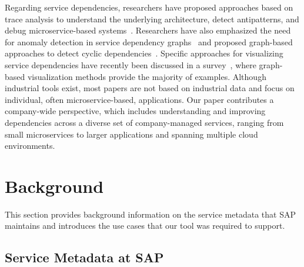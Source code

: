 \documentclass[conference]{IEEEtran}
\begin{document}
Regarding service dependencies, researchers have proposed approaches based on trace analysis to understand the underlying architecture, detect antipatterns, and debug microservice-based systems~\cite{zhou2018fault, DBLP:conf/sigsoft/Guo0WLJDXS20}. %
Researchers have also emphasized the need for anomaly detection in service dependency graphs~\cite{DBLP:conf/bir/GaidelsK20} and proposed graph-based approaches to detect cyclic dependencies~\cite{10.1109/ficloud57274.2022.00042}. %
Specific approaches for visualizing service dependencies have recently been discussed in a survey~\cite{10.1109/sose55356.2022.00011}, where graph-based visualization methods provide the majority of examples.
Although industrial tools exist, most papers are not based on industrial data and focus on individual, often microservice-based, applications.
Our paper contributes a company-wide perspective, which includes understanding and improving dependencies across a diverse set of company-managed services, ranging from small microservices to larger applications and spanning multiple cloud environments.

\section{Background}
\label{sec:background}

This section provides background information on the service metadata that SAP maintains and introduces the use cases that our tool was required to support.

\subsection{Service Metadata at SAP}
\label{sec:service-metadata}
\end{document}

